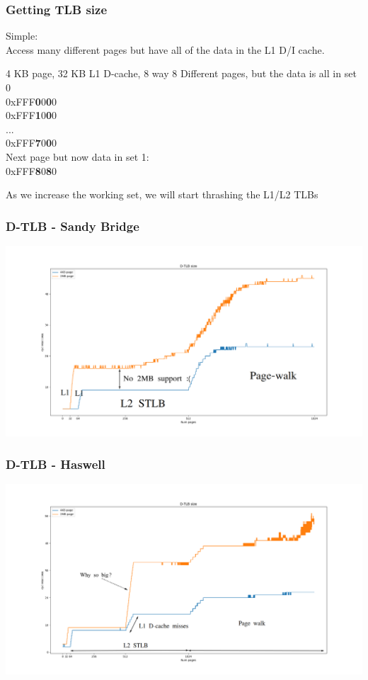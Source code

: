 \documentclass{beamer}
\begin{document}
\begin{frame}
\frametitle{Getting TLB size}
Simple:\\
Access many different pages but have all of the data in the L1 D/I cache.
\begin{block}{4 KB page, 32 KB L1 D-cache, 8 way}
8 Different pages, but the data is all in set 0\\
0xFFF\textbf{0}0\textbf{0}0\\
0xFFF\textbf{1}0\textbf{0}0\\
...\\
0xFFF\textbf{7}0\textbf{0}0\\
Next page but now data in set 1:\\
0xFFF\textbf{8}0\textbf{8}0\\
\end{block}
As we increase the working set, we will start thrashing the L1/L2 TLBs
\end{frame}

\begin{frame}
\frametitle{D-TLB - Sandy Bridge}
\centerline{\includegraphics[scale=.23]{img/dtlb_size_sandybridge.png}}
\end{frame}

\begin{frame}
\frametitle{D-TLB - Haswell}
\centerline{\includegraphics[scale=.23]{img/dtlb_size_haswell.png}}
\end{frame}
\end{document}
